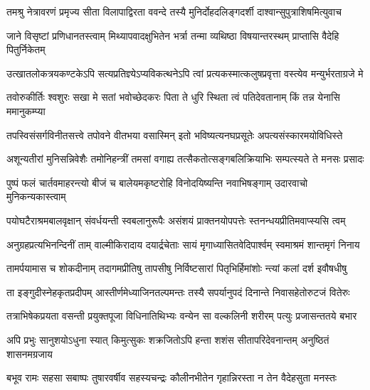 \fourlineindentedshloka
{तमश्रु नेत्रावरणं प्रमृज्य}
{सीता विलापाद्विरता ववन्दे}
{तस्यै मुनिर्दोहदलिङ्गदर्शी}
{दाश्वान्सुपुत्राशिषमित्युवाच} %

\fourlineindentedshloka
{जाने विसृष्टां प्रणिधानतस्त्वाम्}
{मिथ्यापवादक्षुभितेन भर्त्रा}
{तन्मा व्यथिष्ठा विषयान्तरस्थम्}
{प्राप्तासि वैदेहि पितुर्निकेतम्} %

\fourlineindentedshloka
{उत्खातलोकत्रयकण्टकेऽपि}
{सत्यप्रतिज्ञ्येऽप्यविकत्थनेऽपि}
{त्वां प्रत्यकस्मात्कलुषप्रवृत्ता}
{वस्त्येव मन्युर्भरताग्रजे मे} %

\fourlineindentedshloka
{तवोरुकीर्तिः श्वशुरः सखा मे}
{सतां भवोच्छेदकरः पिता ते}
{धुरि स्थिता त्वं पतिदेवतानाम्}
{किं तन्न येनासि ममानुकम्प्या} %

\fourlineindentedshloka
{तपस्विसंसर्गविनीतसत्त्वे}
{तपोवने वीतभया वसास्मिन्}
{इतो भविष्यत्यनघप्रसूतेः}
{अपत्यसंस्कारमयोविधिस्ते} %

\fourlineindentedshloka
{अशून्यतीरां मुनिसन्निवेशैः}
{तमोनिहन्त्रीं तमसां वगाह्य}
{तत्सैकतोत्सङ्गबलिक्रियाभिः}
{सम्पत्स्यते ते मनसः प्रसादः} %

\fourlineindentedshloka
{पुष्पं फलं चार्तवमाहरन्त्यो}
{बीजं च बालेयमकृष्टरोहि}
{विनोदयिष्यन्ति नवाभिषङ्गाम्}
{उदारवाचो मुनिकन्यकास्त्वाम्} %

\fourlineindentedshloka
{पयोघटैराश्रमबालवृक्षान्}
{संवर्धयन्ती स्वबलानुरूपैः}
{असंशयं प्राक्तनयोपपत्तेः}
{स्तनन्धयप्रीतिमवाप्स्यसि त्वम्} %

\fourlineindentedshloka
{अनुग्रहप्रत्यभिनन्दिनीं ताम्}
{वाल्मीकिरादाय दयार्द्रचेताः}
{सायं मृगाध्यासितवेदिपार्श्वम्}
{स्वमाश्रमं शान्तमृगं निनाय} %

\fourlineindentedshloka
{तामर्पयामास च शोकदीनाम्}
{तदागमप्रीतिषु तापसीषु}
{निर्विष्टसारां पितृभिर्हिमांशोः}
{न्त्यां कलां दर्श इवौषधीषु} %

\fourlineindentedshloka
{ता इङ्गुदीस्नेहकृतप्रदीपम्}
{आस्तीर्णमेध्याजिनतल्पमन्तः}
{तस्यै सपर्यानुपदं दिनान्ते}
{निवासहेतोरुटजं वितेरुः} %

\fourlineindentedshloka
{तत्राभिषेकप्रयता वसन्ती}
{प्रयुक्तपूजा विधिनातिथिभ्यः}
{वन्येन सा वल्कलिनी शरीरम्}
{पत्युः प्रजासन्ततये बभार} %

\fourlineindentedshloka
{अपि प्रभुः सानुशयोऽधुना स्यात्}
{किमुत्सुकः शक्रजितोऽपि हन्ता}
{शशंस सीतापरिदेवनान्तम्}
{अनुष्ठितं शासनमग्रजाय} %

\fourlineindentedshloka
{बभूव रामः सहसा सबाष्पः}
{तुषारवर्षीव सहस्यचन्द्रः}
{कौलीनभीतेन गृहान्निरस्ता}
{न तेन वैदेहसुता मनस्तः} %

